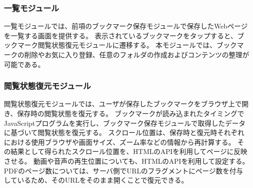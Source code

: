 \subsubsection{一覧モジュール}
一覧モジュールでは、前項のブックマーク保存モジュールで保存したWebページを一覧する画面を提供する。
表示されているブックマークをタップすると、ブックマーク閲覧状態復元モジュールに遷移する。
本モジュールでは、ブックマークの削除やお気に入り登録、任意のフォルダの作成およびコンテンツの整理が可能である。

\subsubsection{閲覧状態復元モジュール}
閲覧状態復元モジュールでは、ユーザが保存したブックマークをブラウザ上で開き、保存時の閲覧状態を復元する。
ブックマークが読み込まれたタイミングでJavaScriptプログラムを実行し、ブックマーク保存モジュールで取得したデータに基づいて閲覧状態を復元する。
スクロール位置は、保存時と復元時それぞれにおける使用ブラウザや画面サイズ、ズーム率などの情報から再計算する。
その結果として得られたスクロール位置を、HTMLのAPIを利用してページに反映させる。
動画や音声の再生位置についても、HTMLのAPIを利用して設定する。
PDFのページ数については、サーバ側でURLのフラグメントにページ数を付与しているため、そのURLをそのまま開くことで復元できる。
